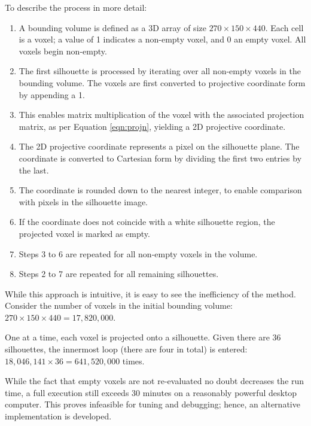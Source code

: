 To describe the process in more detail:

\begin{enumerate}
  \item A bounding volume is defined as a 3D array of size $270\times150\times440$. Each cell is a voxel; a value of 1 indicates a non-empty voxel, and 0 an empty voxel. All voxels begin non-empty.

  \item The first silhouette is processed by iterating over all non-empty voxels in the bounding volume. The voxels are first converted to projective coordinate form by appending a 1.

  \item This enables matrix multiplication of the voxel with the associated projection matrix, as per Equation \ref{eqn:projn}, yielding a 2D projective coordinate.

  \item The 2D projective coordinate represents a pixel on the silhouette plane. The coordinate is converted to Cartesian form by dividing the first two entries by the last.

  \item The coordinate is rounded down to the nearest integer, to enable comparison with pixels in the silhouette image.

  \item If the coordinate does not coincide with a white silhouette region, the projected voxel is marked as empty.

  \item Steps 3 to 6 are repeated for all non-empty voxels in the volume.

  \item Steps 2 to 7 are repeated for all remaining silhouettes.

\end{enumerate}

While this approach is intuitive, it is easy to see the inefficiency of the method. Consider the number of voxels in the initial bounding volume: $270\times150\times440=17,820,000$.

One at a time, each voxel is projected onto a silhouette. Given there are 36 silhouettes, the innermost loop (there are four in total) is entered: $18,046,141\times36=641,520,000$ times.

While the fact that empty voxels are not re-evaluated no doubt decreases the run time, a full execution still exceeds 30 minutes on a reasonably powerful desktop computer. This proves infeasible for tuning and debugging; hence, an alternative implementation is developed.

